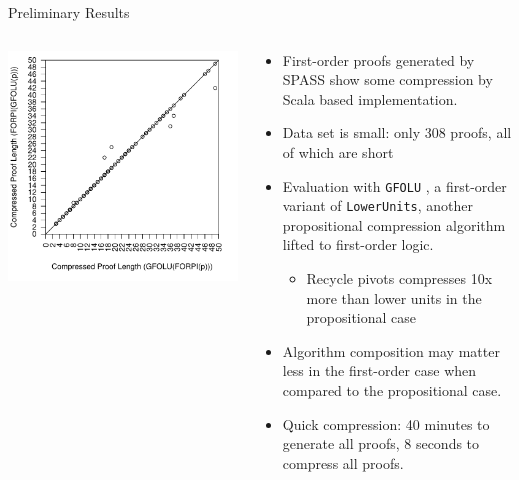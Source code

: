 \documentclass[final]{beamer} %
\begin{document}
\begin{frame}{}
\begin{columns}
\begin{column}{0.48\textwidth}
\begin{block}{Preliminary Results}
\begin{columns}
\begin{column}{0.35\textwidth}
\includegraphics[scale=1]{images/forpi-folu-vs-folu-forpi-length_vs_compress_length_all_proofs.pdf}
\end{column}
\begin{column}{0.65\textwidth}
\begin{itemize}
\item First-order proofs generated by SPASS show some compression by Scala based implementation.
\item Data set is small: only 308 proofs, all of which are short
\item Evaluation with \texttt{GFOLU} \cite{GFOLU}, a first-order variant of \texttt{LowerUnits}, another propositional compression algorithm lifted to first-order logic.
\begin{itemize}
\item Recycle pivots compresses 10x more than lower units in the propositional case
\end{itemize}
\item Algorithm composition may matter less in the first-order case when compared to the propositional case.
\item Quick compression: 40 minutes to generate all proofs, 8 seconds to compress all proofs.
\end{itemize}
\end{column}
\end{columns}
    \end{block}
    

\end{column}
\end{columns}
\end{frame}
\end{document}
